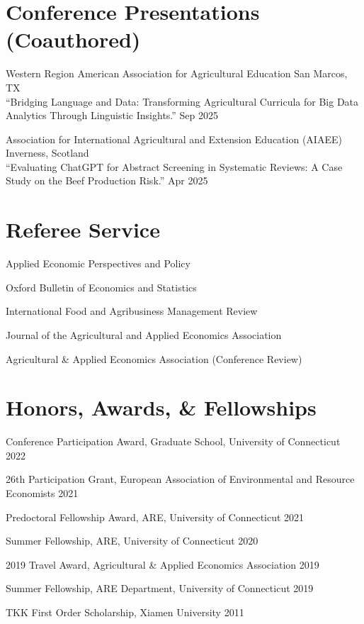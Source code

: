 \documentclass[10.5pt,letterpaper]{article}
\renewenvironment{itemize}{
	\begin{list}{}{
			\setlength{\leftmargin}{1.5em}
		}
	}{
	\end{list}
}
\begin{document}
	
	\section*{\textbf{Conference Presentations (Coauthored)}}
	
	\begin{itemize}
		
		\item[-] Western Region American Association for Agricultural Education \hfill San Marcos, TX \\
		``Bridging Language and Data: Transforming Agricultural Curricula for Big Data Analytics Through Linguistic Insights.'' \hfill Sep 2025
		
		\item[-] Association for International Agricultural and Extension Education (AIAEE) \hfill Inverness, Scotland \\
		``Evaluating ChatGPT for Abstract Screening in Systematic Reviews: A Case Study on the Beef Production Risk.'' \hfill Apr 2025
		
	\end{itemize}
	
	
	\section*{\textbf{Referee Service}}
	\begin{itemize}
		\item[-] Applied Economic Perspectives and Policy
		\item[-] Oxford Bulletin of Economics and Statistics
		\item[-] International Food and Agribusiness Management Review
		\item[-] Journal of the Agricultural and Applied Economics Association
		\item[-] Agricultural \& Applied Economics Association (Conference Review)
	\end{itemize}
	
	\section*{\textbf{Honors, Awards, \& Fellowships}}
	\begin{itemize}
		\item[-] Conference Participation Award, Graduate School, University of Connecticut \hfill 2022
		\item[-] 26th Participation Grant, European Association of Environmental and Resource Economists \hfill 2021
		\item[-] Predoctoral Fellowship Award, ARE, University of Connecticut \hfill 2021
		\item[-] Summer Fellowship, ARE, University of Connecticut \hfill 2020
		\item[-] 2019 Travel Award, Agricultural \& Applied Economics Association  \hfill 2019
		\item[-] Summer Fellowship, ARE Department, University of Connecticut \hfill 2019
		\item[-] TKK First Order Scholarship, Xiamen University \hfill 2011
	\end{itemize}
	
\end{document}

